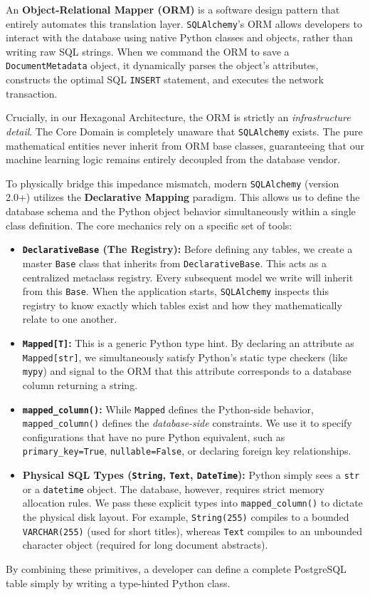 An \textbf{Object-Relational Mapper (ORM)} is a software design pattern that entirely automates this translation layer. \texttt{SQLAlchemy}'s ORM allows developers to interact with the database using native Python classes and objects, rather than writing raw SQL strings. When we command the ORM to save a \texttt{DocumentMetadata} object, it dynamically parses the object's attributes, constructs the optimal SQL \texttt{INSERT} statement, and executes the network transaction.

Crucially, in our Hexagonal Architecture, the ORM is strictly an \textit{infrastructure detail}. The Core Domain is completely unaware that \texttt{SQLAlchemy} exists. The pure mathematical entities never inherit from ORM base classes, guaranteeing that our machine learning logic remains entirely decoupled from the database vendor.

To physically bridge this impedance mismatch, modern \texttt{SQLAlchemy} (version 2.0+) utilizes the \textbf{Declarative Mapping} paradigm. This allows us to define the database schema and the Python object behavior simultaneously within a single class definition. The core mechanics rely on a specific set of tools:

\begin{itemize}
    \item \textbf{\texttt{DeclarativeBase} (The Registry):} Before defining any tables, we create a master \texttt{Base} class that inherits from \texttt{DeclarativeBase}. This acts as a centralized metaclass registry. Every subsequent model we write will inherit from this \texttt{Base}. When the application starts, \texttt{SQLAlchemy} inspects this registry to know exactly which tables exist and how they mathematically relate to one another.
    \item \textbf{\texttt{Mapped[T]}:} This is a generic Python type hint. By declaring an attribute as \texttt{Mapped[str]}, we simultaneously satisfy Python's static type checkers (like \texttt{mypy}) and signal to the ORM that this attribute corresponds to a database column returning a string.
    \item \textbf{\texttt{mapped\_column()}:} While \texttt{Mapped} defines the Python-side behavior, \texttt{mapped\_column()} defines the \textit{database-side} constraints. We use it to specify configurations that have no pure Python equivalent, such as \texttt{primary\_key=True}, \texttt{nullable=False}, or declaring foreign key relationships.
    \item \textbf{Physical SQL Types (\texttt{String}, \texttt{Text}, \texttt{DateTime}):} Python simply sees a \texttt{str} or a \texttt{datetime} object. The database, however, requires strict memory allocation rules. We pass these explicit types into \texttt{mapped\_column()} to dictate the physical disk layout. For example, \texttt{String(255)} compiles to a bounded \texttt{VARCHAR(255)} (used for short titles), whereas \texttt{Text} compiles to an unbounded character object (required for long document abstracts).
\end{itemize}
By combining these primitives, a developer can define a complete PostgreSQL table simply by writing a type-hinted Python class.


